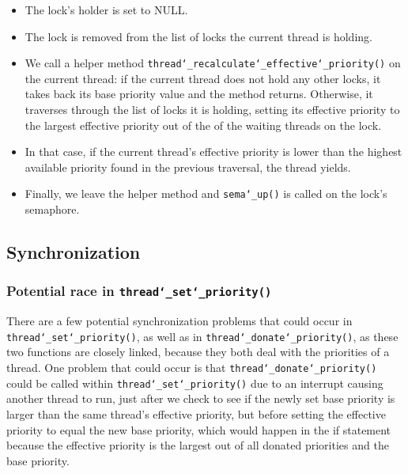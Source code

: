 \documentclass{article}
\renewcommand{\_}{\char`_}
\begin{document}
\begin{itemize}

\item The lock's holder is set to NULL.

\item The lock is removed from the list of locks the current thread is holding.

\item We call a helper method \texttt{thread\_recalculate\_effective\_priority()} on the current thread: if the current thread does not hold any other locks, it takes back its base priority value and the method returns. Otherwise, it traverses through the list of locks it is holding, setting its effective priority to the largest effective priority out of the of the waiting threads on the lock.

\item In that case, if the current thread's effective priority is lower than the highest available priority found in the previous traversal, the thread yields.

\item Finally, we leave the helper method and \texttt{sema\_up()} is called on the lock's semaphore.

\end{itemize}

\subsection{Synchronization}
\subsubsection{Potential race in \texttt{thread\_set\_priority()}}

There are a few potential synchronization problems that could occur in \texttt{thread\_set\_priority()}, as well as in \texttt{thread\_donate\_priority()}, as these two functions are closely linked, because they both deal with the priorities of a thread. One problem that could occur is that \texttt{thread\_donate\_priority()} could be called within \texttt{thread\_set\_priority()} due to an interrupt causing another thread to run, just after we check to see if the newly set base priority is larger than the same thread's effective priority, but before setting the effective priority to equal the new base priority, which would happen in the if statement because the effective priority is the largest out of all donated priorities and the base priority. 
\end{document}
